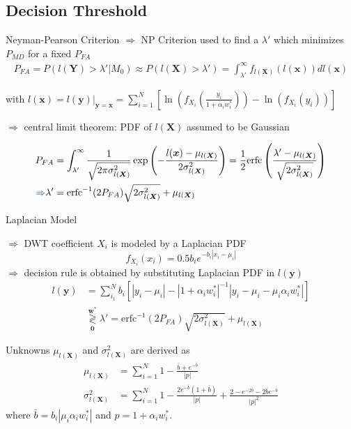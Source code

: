 \subsection{Decision Threshold}
\begin{frame}{\insertsubsection}{Neyman-Pearson Criterion}
\textcolor{TUDblue}{$\Rightarrow$} NP Criterion used to find a $\lambda'$ which minimizes $P_{MD}$ for a fixed $P_{FA}$
\begin{align*}
P_{FA} = P(l(\bm Y) > \lambda' | M_0) \approx P(l(\bm X) > \lambda') = \int_{\lambda'}^\infty f_{l(\bm X)}(l(\bm x)) dl(\bm x)
\end{align*}

with $l(\bm x) = l(\bm y)|_{\bm y = \bm x} = \sum\limits_{i=1}^{N} \left[ \ln\left(f_{X_i}\left(\frac{y_i}{1 + \alpha_i w^*_i}\right)\right)  - \ln\left(f_{X_i}(y_i)\right)  \right]$

\textcolor{TUDblue}{$\Rightarrow$} central limit theorem: PDF of $l(\bm X)$ assumed to be Gaussian

\begin{align*}
P_{FA} &= \int_{\lambda'}^\infty \frac{1}{\sqrt{2 \pi \sigma^2_{l(\bm X)}}} \exp\left( - \frac{l(\bm x) - \mu_{l(\bm X)}}{2 \sigma^2_{l(\bm X)}} \right) = \frac{1}{2} \text{erfc}\left( \frac{\lambda' - \mu_{l(\bm X)}}{\sqrt{2 \sigma^2_{l(\bm X)}}}\right)\\
\textcolor{TUDblue}{\Rightarrow} \lambda' &= \text{erfc}^{-1} (2 P_{FA}) \sqrt{2 \sigma^2_{l(\bm X)}} + \mu_{l(\bm X)}
\end{align*}

\end{frame}

\begin{frame}{\insertsubsection}{Laplacian Model}

\textcolor{TUDblue}{$\Rightarrow$} DWT coefficient $X_i$ is modeled by a Laplacian PDF 
\begin{equation*}
f_{X_i}(x_i) = 0.5b_i e^{-b_i|x_i - \mu_i | }
\end{equation*}	
\textcolor{TUDblue}{$\Rightarrow$} decision rule is obtained by substituting Laplacian PDF in $l(\bm y)$
\begin{align*}
l(\bm y) &= \sum_{i_1}^N b_i \left[ |y_i - \mu_i| - |1 + \alpha_i w_i^* |^{-1} |y_i -\mu_i - \mu_i \alpha_i w_i^* |\right]   \\
&\underset{\bm 0}{\overset{\bm w^*}{\gtrless}} \lambda' = \text{erfc}^{-1} (2 P_{FA}) \sqrt{2 \sigma^2_{l(\bm X)}} + \mu_{l(\bm X)}
\end{align*}

\end{frame}


\begin{frame}{\insertsubsection}{Unknowns}
$\mu_{l(\bm X)}$ and $\sigma^2_{l(\bm X)}$ are derived as
\begin{align*}
\mu_{l(\bm X)} &= \sum_{i= 1}^N {1 - \frac{\bar{b}+ e^{-\bar{b}}}{|p|}}\\
\sigma^2_{l(\bm X)} &= \sum_{i= 1}^N 1-\frac{2e^{-\bar{b}} (1 + \bar{b})}{|p|} +\frac{2-e^{-2\bar{b}}-2\bar{b}e^{-\bar{b}}}{|p|^2}
\end{align*}
where $\bar{b} = b_i|\mu_i\alpha_iw_i^*|$  and $p = 1+\alpha_iw_i^*$.

\end{frame}